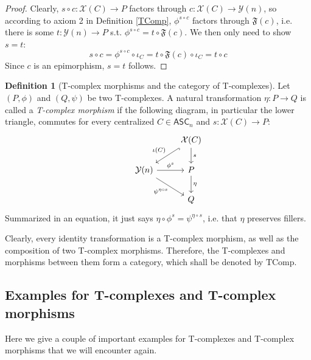 \documentclass{article}
\theoremstyle{remark}
\theoremstyle{definition}
\newtheorem{definition}{Definition}[subsection]
\newcommand{\ASC}{\mathsf{ASC}}
\newcommand{\Y}{\mathcal Y}
\newcommand{\X}{\mathcal X}
\newcommand{\F}{\mathfrak F}
\newcommand{\TComp}{\mathrm{TComp}}
\begin{document}
	\begin{proof}
		Clearly, $s\circ c:\X(C)\to P$ factors through $c:\X(C)\to\Y(n)$, so according to axiom 2 in Definition \ref{TComp}, $\phi^{s\circ c}$ factors through $\F(c)$, i.e. there is some $t:\Y(n)\to P$ s.t. $\phi^{s\circ c}=t\circ\F(c)$. We then only need to show $s=t$:
		\[s\circ c=\phi^{s\circ c}\circ\iota_C=t\circ\F(c)\circ\iota_C=t\circ c\]
		Since $c$ is an epimorphism, $s=t$ follows.
	\end{proof}
	\begin{definition}[T-complex morphisms and the category of T-complexes]
		Let $(P,\phi)$ and $(Q,\psi)$ be two T-complexes. A natural transformation $\eta:P\to Q$ is called a \textit{T-complex morphism} if the following diagram, in particular the lower triangle, commutes for every centralized $C\in\ASC_n$ and $s:\X(C)\to P$:
		\[\begin{tikzcd}
			&&\X(C)\arrow{d}{s}\arrow[hook]{ld}[swap]{\iota(C)}\\
			&\Y(n)\arrow{r}{\phi^s}\arrow{dr}[swap]{\psi^{\eta\circ s}}&P\arrow{d}{\eta}\\
			&&Q
		\end{tikzcd}\]
		Summarized in an equation, it just says $\eta\circ\phi^s=\psi^{\eta\circ s}$, i.e. that $\eta$ preserves fillers.
		
		Clearly, every identity transformation is a T-complex morphism, as well as the composition of two T-complex morphisms. Therefore, the T-complexes and morphisms between them form a category, which shall be denoted by $\TComp$.
	\end{definition}
	\subsection{Examples for T-complexes and T-complex morphisms}
	Here we give a couple of important examples for T-complexes and T-complex morphisms that we will encounter again.
	
\end{document}
